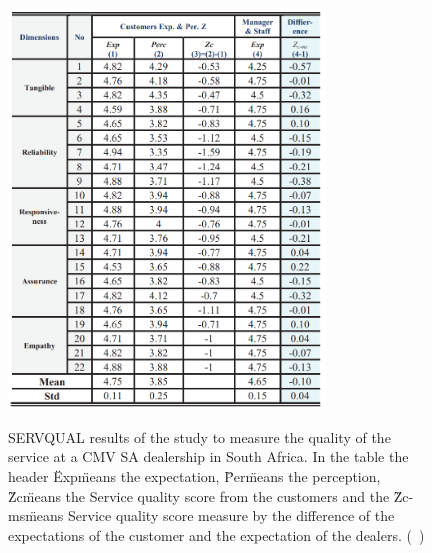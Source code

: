   \begin{figure}[h]
    \caption{SERVQUAL results of the study to measure the quality of the service at a CMV SA dealership in South Africa. In the table the header \"Exp\" means the expectation, \"Per\" means the perception, \"Zc\" means the Service quality score from the customers and the \"Zc-ms\" means Service quality score measure by the difference of the expectations of the customer and the expectation of the dealers. (~\cite{Measuring_After_sales_Service_Quality})}
    \centering
    \includegraphics[width=0.75\textwidth]{figs/SERVQUAL_results}
    \label{fig:SERVQUAL_results}
  \end{figure}
  